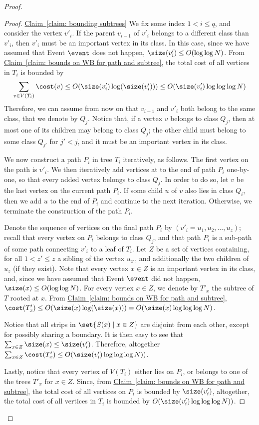 \documentclass[11pt]{article}
\numberwithin{equation}{section}
\theoremstyle{definition}
\theoremstyle{plain}
\newcommand{\expref}[2]{\hyperref[#2]{#1~\ref{#2}}}
\begin{document}
\begin{proof}
\begin{proof}{\expref{Claim}{claim: bounding subtrees}}
We fix some index $1<i\leq q$, and consider the vertex $v'_i$. If the parent $v_{i-1}$ of $v'_i$ belongs to a different class than $v'_i$, then $v'_i$ must be an important vertex in its class. In this case, since we have assumed that Event $\event$ does not happen, $\size(v'_i)\leq O(\log\log N)$. 
From \expref{Claim}{claim: bounds on WB for path and subtree}, the total cost of all vertices in $T_i$ is bounded by 
$$\sum_{v \in V(T_i)} \cost(v) \leq O(\size(v'_i)\log(\size(v'_i)))\leq O(\size(v'_i)\log\log\log N)$$  
Therefore, we can assume from now on that $v_{i-1}$ and $v'_i$ both belong to the same class, that we denote by $Q_j$.
Notice that, if a vertex $v$ belongs to class $Q_j$, then at most one of its children may belong to class $Q_j$; the other child must belong to some class $Q_{j'}$ for $j'<j$, and it must be an important vertex in its class.

We now construct a path $P_i$ in tree $T_i$ iteratively, as follows. 
The first vertex on the path is $v'_i$. 
We then iteratively add vertices at to the end of path $P_i$ one-by-one, so that every added vertex belongs to class $Q_j$. 
In order to do so, let $v$ be the last vertex on the current path $P_i$. 
If some child $u$ of $v$ also lies in class $Q_i$, then we add $u$ to the end of $P_i$ and continue to the next iteration. 
Otherwise, we terminate the construction of the path $P_i$.


Denote the sequence of vertices on the final path $P_i$ by $(v'_i=u_1,u_2,\ldots,u_z)$; recall that every vertex on $P_i$ belongs to class $Q_j$, and that path $P_i$ is a sub-path of some path connecting $v'_i$ to a leaf of $T_i$. Let $Z$ be a set of vertices containing, for all $1<z'\leq z$ a sibling of the vertex $u_{z'}$, and additionally the two children of $u_z$ (if they exist). Note that every vertex $x\in Z$ is an important vertex in its class, and, since we have assumed that Event $\event$ did not happen, $\size(x)\leq O(\log\log N)$. For every vertex $x\in Z$, we denote by $T'_x$ the subtree of $T$ rooted at $x$. From \expref{Claim}{claim: bounds on WB for path and subtree}, $\cost(T'_x)\leq O(\size(x)\log(\size(x)))=O(\size(x)\log\log\log N)$.

Notice that all strips in $\set{S(x)\mid x\in Z}$ are disjoint from each other, except for possibly sharing a boundary. It is then easy to see that $\sum_{x\in Z}\size(x)\leq \size(v'_i)$. Therefore, altogether $\sum_{x\in Z}\cost(T'_x)\leq O(\size(v'_i)\log\log\log N))$.

Lastly, notice that every vertex of $V(T_i)$ either lies on $P_i$, or belongs to one of the trees $T'_x$ for $x\in Z$. Since, from \expref{Claim}{claim: bounds on WB for path and subtree}, the total cost of all vertices on $P_i$ is bounded by $\size(v'_i)$, altogether, the total cost of all vertices in $T_i$ is bounded by $O(\size(v'_i)\log\log\log N))$.
\end{proof}
\end{proof}
\end{document}
